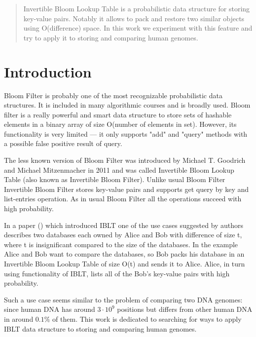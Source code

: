 \documentclass{article}
\begin{document}
\makeTitlePage

\begin{abstract}
    Invertible Bloom Lookup Table is a probabilistic data structure for storing
    key-value pairs. Notably it allows to pack and restore two 
    similar objects using O(difference) space. In this work we experiment with 
    this feature and try to apply it to storing and comparing human genomes.
\end{abstract}
\tableofcontents


\section{Introduction}

Bloom Filter is probably one of the most recognizable probabilistic data
structures. It is included in many algorithmic courses and is broadly used.
Bloom filter is a really powerful and smart data structure to store sets 
of hashable elements in a binary array of size O(number of elements in set).
However, its functionality is very limited --- it only supports "add"
and "query" methods with a possible false positive result of query.%

The less known version of Bloom Filter was introduced by Michael T. Goodrich 
and Michael Mitzenmacher in 2011 and was called Invertible Bloom Lookup 
Table (also known as Invertible Bloom Filter). Unlike usual Bloom Filter 
Invertible Bloom Filter stores key-value pairs and supports get query by 
key and list-entries operation. As in usual Bloom Filter all the operations 
succeed with high probability.


In a paper (\textcite{GoMi2011}) which introduced IBLT one of the use cases suggested by authors 
describes two databases each owned by Alice and Bob with difference of size 
t, where t is insignificant compared to the size of the databases. In the 
example Alice and Bob want to compare the databases, so Bob packs his 
database in an Invertible Bloom Lookup Table of size O(t) and sends it to 
Alice. Alice, in turn using functionality of IBLT, lists all of the Bob's 
key-value pairs with high probability.


Such a use case seems similar to the problem of comparing two DNA genomes: 
since human DNA has around $3 \cdot 10^{9}$ positions but differs from other 
human DNA in around $0.1\%$ of them. This work is dedicated to 
searching for ways to apply IBLT data structure to storing and comparing
human genomes.
\end{document}
